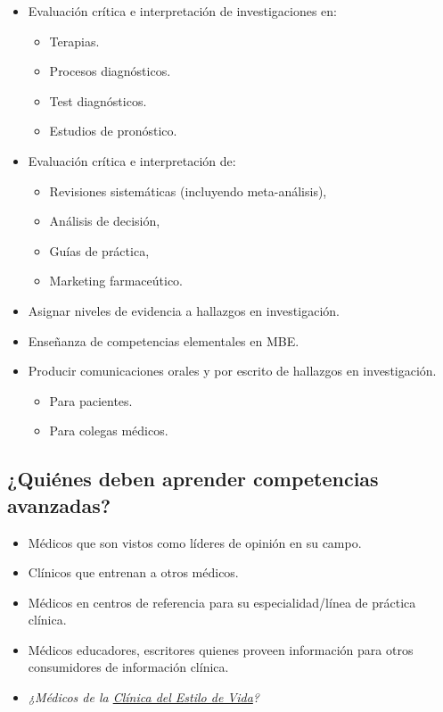 \documentclass[]{book}
\providecommand{\tightlist}{%
  \setlength{\itemsep}{0pt}\setlength{\parskip}{0pt}}
\begin{document}
\begin{itemize}
\tightlist
\item
  Evaluación crítica e interpretación de investigaciones en:

  \begin{itemize}
  \tightlist
  \item
    Terapias.
  \item
    Procesos diagnósticos.
  \item
    Test diagnósticos.
  \item
    Estudios de pronóstico.
  \end{itemize}
\item
  Evaluación crítica e interpretación de:

  \begin{itemize}
  \tightlist
  \item
    Revisiones sistemáticas (incluyendo meta-análisis),
  \item
    Análisis de decisión,
  \item
    Guías de práctica,
  \item
    Marketing farmaceútico.
  \end{itemize}
\item
  Asignar niveles de evidencia a hallazgos en investigación.
\item
  Enseñanza de competencias elementales en MBE.
\item
  Producir comunicaciones orales y por escrito de hallazgos en investigación.

  \begin{itemize}
  \tightlist
  \item
    Para pacientes.
  \item
    Para colegas médicos.
  \end{itemize}
\end{itemize}

\hypertarget{quienes-deben-aprender-competencias-avanzadas}{%
\subsection{¿Quiénes deben aprender competencias avanzadas?}\label{quienes-deben-aprender-competencias-avanzadas}}

\begin{itemize}
\tightlist
\item
  Médicos que son vistos como líderes de opinión en su campo.
\item
  Clínicos que entrenan a otros médicos.
\item
  Médicos en centros de referencia para su especialidad/línea de práctica clínica.
\item
  Médicos educadores, escritores quienes proveen información para otros consumidores de información clínica.
\item
  \emph{¿Médicos de la \href{http://clinicadelestilodevida.org/}{Clínica del Estilo de Vida}?}
\end{itemize}
\end{document}
